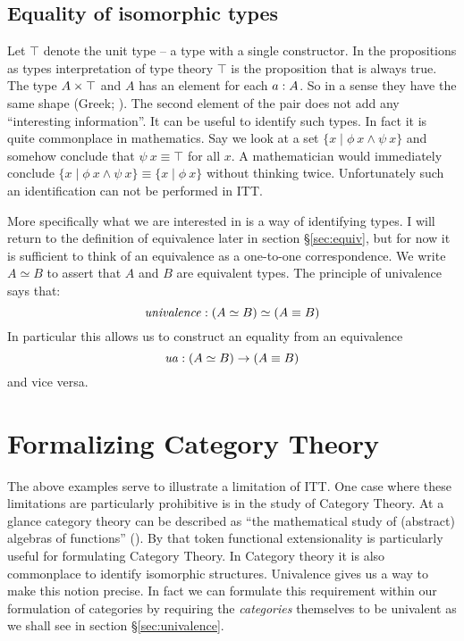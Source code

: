 \subsection{Equality of isomorphic types}
%
Let $\top$ denote the unit type -- a type with a single constructor.
In the propositions as types interpretation of type theory $\top$ is
the proposition that is always true.  The type $A \times \top$ and $A$ has
an element for each $a \mathrel{:} A$.  So in a sense they have the same shape
(Greek; ).  The second element of the pair does
not add any ``interesting information''.  It can be useful to identify
such types.  In fact it is quite commonplace in mathematics.  Say we
look at a set $\{x \mid \phi\ x \land \psi\ x\}$ and somehow conclude
that $\psi\ x \equiv \top$ for all $x$.  A mathematician would
immediately conclude $\{x \mid \phi\ x \land \psi\ x\} \equiv \{x \mid
\phi\ x\}$ without thinking twice.  Unfortunately such an
identification can not be performed in ITT.

More specifically what we are interested in is a way of identifying
 types.  I will return to the definition of
equivalence later in section \S\ref{sec:equiv}, but for now it is
sufficient to think of an equivalence as a one-to-one correspondence.
We write $A \simeq B$ to assert that $A$ and $B$ are equivalent types.
The principle of univalence says that:
%
$$\mathit{univalence} \mathrel{:} (A \simeq B) \simeq (A \equiv B)$$
%
In particular this allows us to construct an equality from an equivalence
%
$$\mathit{ua} \mathrel{:} (A \simeq B) \to (A \equiv B)$$
%
and vice versa.

\section{Formalizing Category Theory}
%
The above examples serve to illustrate a limitation of ITT.  One case
where these limitations are particularly prohibitive is in the study
of Category Theory.  At a glance category theory can be described as
``the mathematical study of (abstract) algebras of functions''
(\cite{awodey-2006}).  By that token functional extensionality is
particularly useful for formulating Category Theory.  In Category
theory it is also commonplace to identify isomorphic structures.
Univalence gives us a way to make this notion precise.  In fact we can
formulate this requirement within our formulation of categories by
requiring the \emph{categories} themselves to be univalent as we shall
see in section \S\ref{sec:univalence}.

